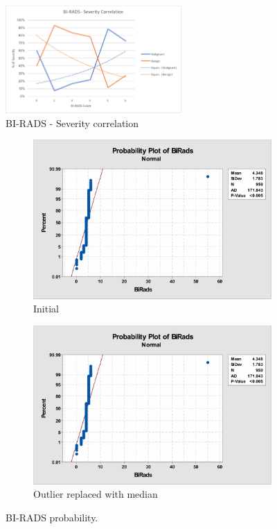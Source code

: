 \documentclass[12pt]{article}
\begin{document}
        \begin{figure}[H]
          \centering
          \includegraphics[width=0.6\textwidth]{birads-severity-correlation}
          \caption{BI-RADS - Severity correlation}
          \label{fig:birads-severity-correlation}
        \end{figure}

        \begin{figure}[H]
          \begin{subfigure}[b]{0.45\textwidth}
            \includegraphics[width=\textwidth]{birads-probability}
            \caption{Initial}
            \label{fig:birads-probability}
          \end{subfigure}
          \hfill
          \begin{subfigure}[b]{0.45\textwidth}
            \includegraphics[width=\textwidth]{birads-probability}
            \caption{Outlier replaced with median}
            \label{fig:birads-probability}
          \end{subfigure}
          \caption{BI-RADS probability.}
        \end{figure}
\end{document}
